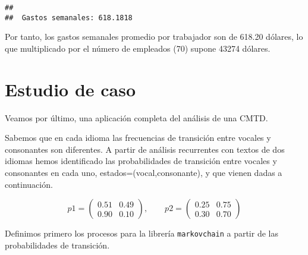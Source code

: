 \documentclass[
]{book}
\theoremstyle{definition}
\theoremstyle{definition}
\theoremstyle{definition}
\theoremstyle{definition}
\theoremstyle{remark}
\begin{document}
\begin{verbatim}
## 
##  Gastos semanales: 618.1818
\end{verbatim}

Por tanto, los gastos semanales promedio por trabajador son de 618.20 dólares, lo que multiplicado por el número de empleados (70) supone 43274 dólares.

\hypertarget{estudio-de-caso}{%
\section{Estudio de caso}\label{estudio-de-caso}}

Veamos por último, una aplicación completa del análisis de una CMTD.

Sabemos que en cada idioma las frecuencias de transición entre vocales y consonantes son diferentes. A partir de análisis recurrentes con textos de dos idiomas hemos identificado las probabilidades de transición entre vocales y consonantes en cada uno, estados=(vocal,consonante), y que vienen dadas a continuación.

\[p1=\left(\begin{matrix}
0.51 & 0.49 \\
0.90 & 0.10
\end{matrix}
\right), \qquad 
p2=\left(\begin{matrix}
0.25 & 0.75 \\
0.30 & 0.70
\end{matrix}
\right)\]

Definimos primero los procesos para la librería \texttt{markovchain} a partir de las probabilidades de transición.
\end{document}
